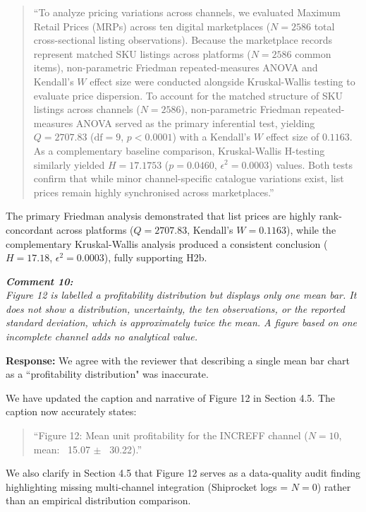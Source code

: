 \documentclass[11pt]{article}
\newcommand{\comment}[1]{\vspace{12pt}\noindent\colorbox{gray!10}{\parbox{\dimexpr\textwidth-2\fboxsep\relax}{\color{commentcolor}\itshape #1}}\vspace{6pt}}
\newcommand{\response}{\vspace{6pt}\noindent\textbf{Response: }}
\newcommand{\update}[1]{\textcolor{updatecolor}{#1}}
\begin{document}
\begin{quote}
\update{``To analyze pricing variations across channels, we evaluated Maximum Retail Prices (MRPs) across ten digital marketplaces ($N = 2586$ total cross-sectional listing observations). Because the marketplace records represent matched SKU listings across platforms ($N = 2586$ common items), non-parametric Friedman repeated-measures ANOVA and Kendall's $W$ effect size were conducted alongside Kruskal-Wallis testing to evaluate price dispersion. To account for the matched structure of SKU listings across channels ($N = 2586$), non-parametric Friedman repeated-measures ANOVA served as the primary inferential test, yielding $Q = 2707.83$ ($\text{df} = 9$, $p < 0.0001$) with a Kendall's $W$ effect size of $0.1163$. As a complementary baseline comparison, Kruskal-Wallis H-testing similarly yielded $H = 17.1753$ ($p = 0.0460$, $\epsilon^2 = 0.0003$) values. Both tests confirm that while minor channel-specific catalogue variations exist, list prices remain highly synchronised across marketplaces.''}
\end{quote}

The primary Friedman analysis demonstrated that list prices are highly rank-concordant across platforms ($Q = 2707.83$, Kendall's $W = 0.1163$), while the complementary Kruskal-Wallis analysis produced a consistent conclusion ($H = 17.18$, $\epsilon^2 = 0.0003$), fully supporting H2b.

\comment{\textbf{Comment 10:} \\
Figure 12 is labelled a profitability distribution but displays only one mean bar. It does not show a distribution, uncertainty, the ten observations, or the reported standard deviation, which is approximately twice the mean. A figure based on one incomplete channel adds no analytical value.}

\response
We agree with the reviewer that describing a single mean bar chart as a ``profitability distribution" was inaccurate. 

We have updated the caption and narrative of Figure 12 in Section 4.5. The caption now accurately states:
\begin{quote}
\update{``Figure 12: Mean unit profitability for the INCREFF channel ($N=10$, mean: \rupee~15.07 $\pm$ \rupee~30.22).''}
\end{quote}
We also clarify in Section 4.5 that Figure 12 serves as a data-quality audit finding highlighting missing multi-channel integration (Shiprocket logs = $N=0$) rather than an empirical distribution comparison.
\end{document}
